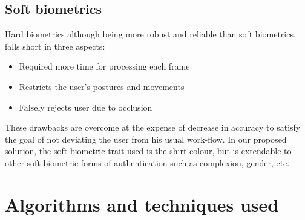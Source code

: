 \documentclass[%
        final,
        notitlepage,
        narroweqnarray,
        inline,
        ]{ieee}
\begin{document}
\subsection{Soft biometrics}
Hard biometrics although being more robust and reliable than soft biometrics, falls short in three aspects\cite{Niin10}:
\begin{itemize}
	\item Required more time for processing each frame
	\item Restricts the user's postures and movements
	\item Falsely rejects user due to occlusion
\end{itemize}
These drawbacks are overcome at the expense of decrease in accuracy to satisfy the goal of not deviating the user from his usual work-flow. 
In our proposed solution, the soft biometric trait used is the shirt colour, but is extendable to other soft biometric forms of authentication such as complexion, gender\cite{Jain204}, etc. 


\section{Algorithms and techniques used}
\end{document}
